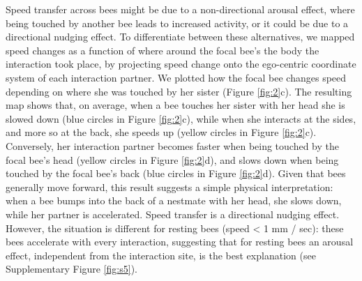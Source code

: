 \documentclass{article}
\begin{document}
Speed transfer across bees might be due to a non-directional arousal effect, where being touched by another bee leads to increased activity, or it could be due to a directional nudging effect. To differentiate between these alternatives, we mapped speed changes as a function of where around the focal bee's the body the interaction took place, by projecting speed change onto the ego-centric coordinate system of each interaction partner. We plotted how the focal bee changes speed depending on where she was touched by her sister (Figure \ref{fig:2}c). The resulting map shows that, on average, when a bee touches her sister with her head she is slowed down (blue circles in Figure \ref{fig:2}c), while when she interacts at the sides, and more so at the back, she speeds up (yellow circles in Figure \ref{fig:2}c). Conversely, her interaction partner becomes faster when being touched by the focal bee’s head (yellow circles in Figure \ref{fig:2}d), and slows down when being touched by the focal bee’s back (blue circles in Figure \ref{fig:2}d). Given that bees generally move forward, this result suggests a simple physical interpretation: when a bee bumps into the back of a nestmate with her head, she slows down, while her partner is accelerated. Speed transfer is a directional nudging effect. However, the situation is different for resting bees (speed < 1 mm / sec): these bees accelerate with every interaction, suggesting that for resting bees an arousal effect, independent from the interaction site, is the best explanation (see Supplementary Figure \ref{fig:s5}).
\end{document}
